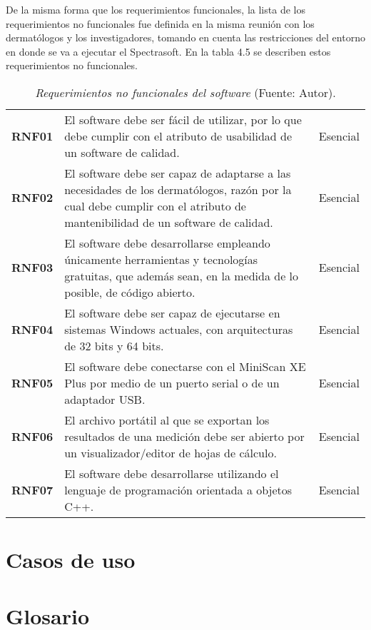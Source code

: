 	De la misma forma que los requerimientos funcionales, la lista de los requerimientos no funcionales fue definida en la misma reuni\'{o}n con los dermat\'{o}logos y los investigadores, tomando en cuenta las restricciones del entorno en donde se va a ejecutar el Spectrasoft. En la tabla 4.5 se describen estos requerimientos no funcionales.
	
	\begin{table}[h]
		\small
		\caption[Requerimientos no funcionales del software]{\textit{Requerimientos no funcionales del software} (Fuente: Autor).}
		\centering
		\setlength{\extrarowheight}{\altocelda}
		\begin{tabulary}{\anchotabla}{|c|J|c|}
			\hline
			 &  & \\ \hline
			\textbf{RNF01} & El software debe ser f\'{a}cil de utilizar, por lo que debe cumplir con el atributo de usabilidad de un software de calidad. & Esencial\\ \hline
			\textbf{RNF02} & El software debe ser capaz de adaptarse a las necesidades de los dermat\'{o}logos, raz\'{o}n por la cual debe cumplir con el atributo de mantenibilidad de un software de calidad. & Esencial\\ \hline
			\textbf{RNF03} & El software debe desarrollarse empleando \'{u}nicamente herramientas y tecnolog\'{i}as gratuitas, que adem\'{a}s sean, en la medida de lo posible, de c\'{o}digo abierto. & Esencial\\ \hline
			\textbf{RNF04} & El software debe ser capaz de ejecutarse en sistemas Windows actuales, con arquitecturas de 32 bits y 64 bits. & Esencial\\ \hline
			\textbf{RNF05} & El software debe conectarse con el MiniScan XE Plus por medio de un puerto serial o de un adaptador USB. & Esencial\\ \hline
			\textbf{RNF06} & El archivo port\'{a}til al que se exportan los resultados de una medici\'{o}n debe ser abierto por un visualizador/editor de hojas de c\'{a}lculo. & Esencial\\ \hline
			\textbf{RNF07} & El software debe desarrollarse utilizando el lenguaje de programaci\'{o}n orientada a objetos C++. & Esencial\\ \hline
		\end{tabulary}
	\end{table}

\section{Casos de uso}

\section{Glosario}
